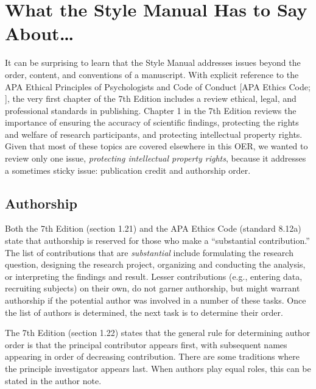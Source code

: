 \documentclass[
  11pt,
]{book}
\begin{document}
\hypertarget{what-the-style-manual--american_psychological_association_publication_2020-has-to-say-about}{%
\section{\texorpdfstring{What the Style Manual \citeyearpar{american_psychological_association_publication_2020} Has to Say About\ldots{}}{What the Style Manual {[}-@american\_psychological\_association\_publication\_2020{]} Has to Say About\ldots{}}}\label{what-the-style-manual--american_psychological_association_publication_2020-has-to-say-about}}

It can be surprising to learn that the Style Manual addresses issues beyond the order, content, and conventions of a manuscript. With explicit reference to the APA Ethical Principles of Psychologists and Code of Conduct {[}APA Ethics Code; \citet{american_psychological_association_ethical_2017}{]}, the very first chapter of the 7th Edition includes a review ethical, legal, and professional standards in publishing. Chapter 1 in the 7th Edition reviews the importance of ensuring the accuracy of scientific findings, protecting the rights and welfare of research participants, and protecting intellectual property rights. Given that most of these topics are covered elsewhere in this OER, we wanted to review only one issue, \emph{protecting intellectual property rights}, because it addresses a sometimes sticky issue: publication credit and authorship order.

\hypertarget{authorship}{%
\subsection{Authorship}\label{authorship}}

Both the 7th Edition (section 1.21) and the APA Ethics Code (standard 8.12a) state that authorship is reserved for those who make a ``substantial contribution.'' The list of contributions that are \emph{substantial} include formulating the research question, designing the research project, organizing and conducting the analysis, or interpreting the findings and result. Lesser contributions (e.g., entering data, recruiting subjects) on their own, do not garner authorship, but might warrant authorship if the potential author was involved in a number of these tasks. Once the list of authors is determined, the next task is to determine their order.

The 7th Edition (section 1.22) states that the general rule for determining author order is that the principal contributor appears first, with subsequent names appearing in order of decreasing contribution. There are some traditions where the principle investigator appears last. When authors play equal roles, this can be stated in the author note.
\end{document}
